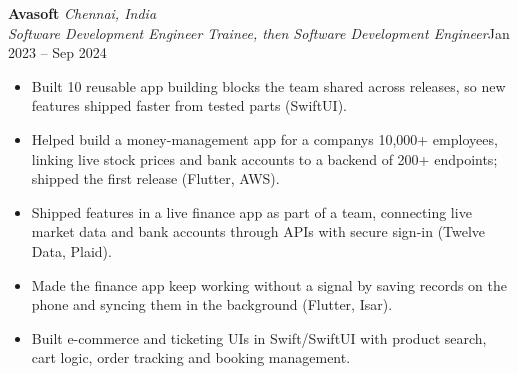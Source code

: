 \documentclass[a4paper,11pt]{article}
\newcommand{\role}[4]{%
  \textbf{#1}{\color{muted}\,\textperiodcentered\,\textit{#2}}\\
  \textit{#4}\hfill{\color{muted}#3}\par}
\newcommand{\gap}{\vspace{5pt}}
\begin{document}
\gap
{}
\role{Avasoft}{Chennai, India}{Jan 2023 – Sep 2024}{Software Development Engineer Trainee, then Software Development Engineer}
\begin{itemize}
  \item Built 10 reusable app building blocks the team shared across releases, so new features shipped faster from tested parts (SwiftUI).
  \item Helped build a money-management app for a company\textquotesingle{}s 10,000+ employees, linking live stock prices and bank accounts to a backend of 200+ endpoints; shipped the first release (Flutter, AWS).
  \item Shipped features in a live finance app as part of a team, connecting live market data and bank accounts through APIs with secure sign-in (Twelve Data, Plaid).
  \item Made the finance app keep working without a signal by saving records on the phone and syncing them in the background (Flutter, Isar).
  \item Built e-commerce and ticketing UIs in Swift/SwiftUI with product search, cart logic, order tracking and booking management.
\end{itemize}
\end{document}
